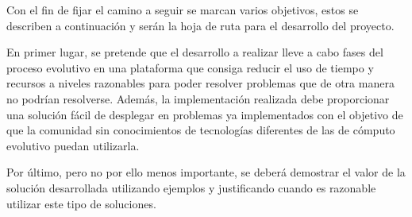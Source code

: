 Con el fin de fijar el camino a seguir se marcan varios objetivos, estos se describen a continuación y serán la hoja de ruta para el desarrollo del proyecto.

En primer lugar, se pretende que el desarrollo a realizar lleve a cabo fases del proceso evolutivo en una plataforma que consiga reducir el uso de tiempo y recursos a niveles razonables para poder resolver problemas que de otra manera no podrían resolverse. Adem\'as, la implementaci\'on realizada debe proporcionar una solución fácil de desplegar en problemas ya implementados con el objetivo de que la comunidad sin conocimientos de tecnologías diferentes de las de cómputo evolutivo puedan utilizarla.

Por \'ultimo, pero no por ello menos importante, se deber\'a demostrar el valor de la soluci\'on desarrollada utilizando ejemplos y justificando cuando es razonable utilizar este tipo de soluciones.
